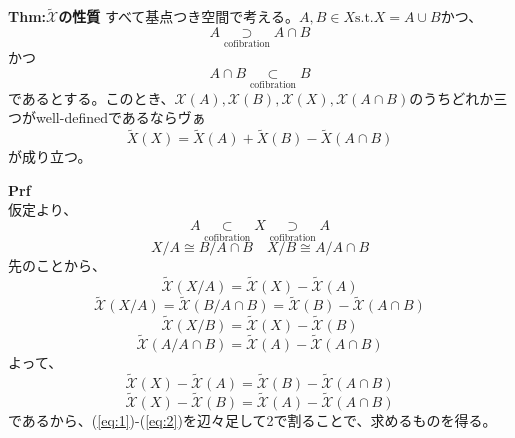 \documentclass[a4paper,11pt]{jsarticle}
\numberwithin{equation}{section}
\begin{document}
\begin{itembox}[l]{\textbf{Thm:$\tilde{\mathcal{X}}$の性質}}
  すべて基点つき空間で考える。$A,B \in X \text{s.t.} X = A \cup B$かつ、
  \begin{equation}
    A \underset{\text{cofibration}}{\supset}A \cap B 
  \end{equation}
  かつ
  \begin{equation}
    A \cap B \underset{\text{cofibration}}{\subset} B 
  \end{equation}
  であるとする。このとき、$\mathcal{X}(A), \mathcal{X}(B), \mathcal{X}(X), \mathcal{X}(A \cap B)$のうちどれか三つがwell-definedであるならヴぁ
  \begin{equation}
    \tilde{X}(X) = \tilde{X}(A) + \tilde{X}(B) - \tilde{X}(A \cap B)
  \end{equation}
  が成り立つ。
  

\end{itembox}
\textbf{Prf}\\
仮定より、
\begin{equation}
  A \underset{\text{cofibration}}{\subset} X \underset{\text{cofibration}}{\supset} A
\end{equation}
\begin{equation}
  X/A \cong B/A \cap B \quad X/B \cong A/A \cap B
\end{equation}
先のことから、
\begin{equation}
  \tilde{\mathcal{X}}(X/A) = \tilde{\mathcal{X}}(X) - \tilde{\mathcal{X}}(A)
\end{equation}
\begin{equation}
  \tilde{\mathcal{X}}(X/A) = \tilde{\mathcal{X}}(B/A \cap B) = \tilde{\mathcal{X}}(B) - \tilde{\mathcal{X}}(A \cap B)
\end{equation}
\begin{equation}
  \tilde{\mathcal{X}}(X/B) = \tilde{\mathcal{X}}(X) - \tilde{\mathcal{X}}(B)
\end{equation}
\begin{equation}
  \tilde{\mathcal{X}}(A/A \cap B) = \tilde{\mathcal{X}}(A) - \tilde{\mathcal{X}}(A \cap B)
\end{equation}
よって、
\begin{equation}
  \tilde{\mathcal{X}}(X) - \tilde{\mathcal{X}}(A) = \tilde{\mathcal{X}}(B) - \tilde{\mathcal{X}}(A \cap B) \label{eq:1}
\end{equation}
\begin{equation}
  \tilde{\mathcal{X}}(X) - \tilde{\mathcal{X}}(B) = \tilde{\mathcal{X}}(A) - \tilde{\mathcal{X}}(A \cap B) \label{eq:2}
\end{equation}
であるから、(\ref{eq:1})-(\ref{eq:2})を辺々足して2で割ることで、求めるものを得る。\\
\end{document}
